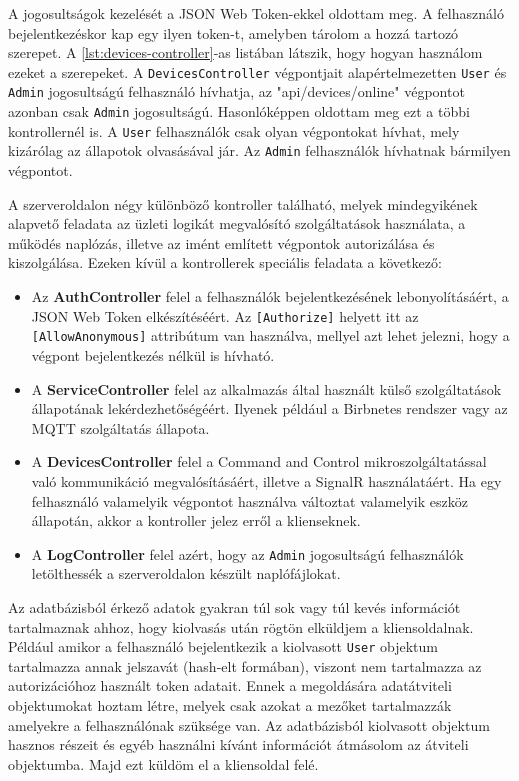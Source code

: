 A jogosultságok kezelését a JSON Web Token-ekkel oldottam meg. A felhasználó bejelentkezéskor kap egy ilyen token-t, 
amelyben tárolom a hozzá tartozó szerepet. A \ref{lst:devices-controller}-as listában látszik, hogy hogyan használom ezeket a szerepeket.
A \verb+DevicesController+ végpontjait alapértelmezetten \verb+User+ és \verb+Admin+ jogosultságú felhasználó hívhatja, az "api/devices/online" végpontot azonban csak \verb+Admin+ jogosultságú.
Hasonlóképpen oldottam meg ezt a többi kontrollernél is. A \verb+User+ felhasználók csak olyan végpontokat hívhat, mely kizárólag az állapotok olvasásával jár.
Az \verb+Admin+ felhasználók hívhatnak bármilyen végpontot.

A szerveroldalon négy különböző kontroller található, melyek mindegyikének alapvető feladata az üzleti logikát megvalósító szolgáltatások használata, a működés naplózás,
illetve az imént említett végpontok autorizálása és kiszolgálása. Ezeken kívül a kontrollerek speciális feladata a következő:
\begin{itemize}
    \item Az \textbf{AuthController} felel a felhasználók bejelentkezésének lebonyolításáért, a JSON Web Token elkészítéséért. Az \verb+[Authorize]+ helyett itt az \verb+[AllowAnonymous]+ attribútum van használva, mellyel azt lehet jelezni, hogy a végpont bejelentkezés nélkül is hívható.
    \item A \textbf{ServiceController} felel az alkalmazás által használt külső szolgáltatások állapotának lekérdezhetőségéért. Ilyenek például a Birbnetes rendszer vagy az MQTT szolgáltatás állapota.
    \item A \textbf{DevicesController} felel a Command and Control mikroszolgáltatással való kommunikáció megvalósításáért, illetve a SignalR használatáért. Ha egy felhasználó valamelyik végpontot használva változtat valamelyik eszköz állapotán, akkor a kontroller jelez erről a klienseknek.
    \item A \textbf{LogController} felel azért, hogy az \verb+Admin+ jogosultságú felhasználók letölthessék a szerveroldalon készült naplófájlokat.
\end{itemize}

Az adatbázisból érkező adatok gyakran túl sok vagy túl kevés információt tartalmaznak ahhoz, hogy kiolvasás után rögtön elküldjem a kliensoldalnak.
Például amikor a felhasználó bejelentkezik a kiolvasott \verb+User+ objektum tartalmazza annak jelszavát (hash-elt formában), viszont nem tartalmazza az autorizációhoz használt token adatait.
Ennek a megoldására adatátviteli objektumokat hoztam létre, melyek csak azokat a mezőket tartalmazzák amelyekre a felhasználónak szüksége van.
Az adatbázisból kiolvasott objektum hasznos részeit és egyéb használni kívánt információt átmásolom az átviteli objektumba. Majd ezt küldöm el a kliensoldal felé.

